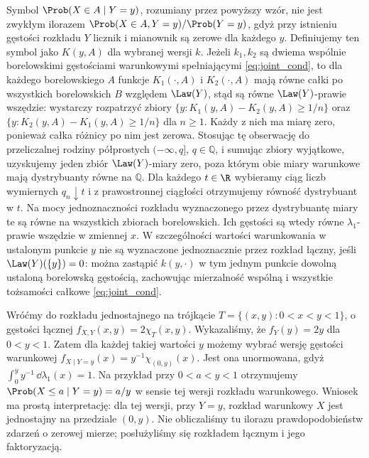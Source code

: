 \begin{uwaga}
Symbol $\Prob(X\in A\mid Y=y)$, rozumiany przez powyższy wzór,
nie jest zwykłym ilorazem $\Prob(X\in A,Y=y)/\Prob(Y=y)$,
gdyż przy istnieniu gęstości rozkładu $Y$ licznik i mianownik
są zerowe dla każdego $y$.
Definiujemy ten symbol jako $K(y,A)$ dla wybranej wersji $k$.
Jeżeli $k_1,k_2$ są dwiema wspólnie borelowskimi gęstościami
warunkowymi spełniającymi \eqref{eq:joint_cond}, to dla każdego
borelowskiego $A$ funkcje $K_1(\cdot,A)$ i $K_2(\cdot,A)$
mają równe całki po wszystkich borelowskich $B$ względem
$\Law(Y)$, stąd są równe $\Law(Y)$-prawie wszędzie:
wystarczy rozpatrzyć zbiory
$\{y:K_1(y,A)-K_2(y,A)\geq1/n\}$ oraz
$\{y:K_2(y,A)-K_1(y,A)\geq1/n\}$ dla $n\geq1$.
Każdy z nich ma miarę zero, ponieważ całka różnicy
po nim jest zerowa.
Stosując tę obserwację do przeliczalnej rodziny półprostych
$(-\infty,q]$, $q\in\mathbb Q$, i sumując zbiory wyjątkowe,
uzyskujemy jeden zbiór $\Law(Y)$-miary zero, poza którym
obie miary warunkowe mają dystrybuanty równe na $\mathbb Q$.
Dla każdego $t\in\R$ wybieramy ciąg liczb wymiernych
$q_n\downarrow t$ i z prawostronnej ciągłości otrzymujemy
równość dystrybuant w $t$. Na mocy jednoznaczności rozkładu
wyznaczonego przez dystrybuantę miary te są równe na
wszystkich zbiorach borelowskich.
Ich gęstości są wtedy równe $\lambda_1$-prawie wszędzie
w zmiennej $x$. W szczególności wartości warunkowania w
ustalonym punkcie $y$ nie są wyznaczone jednoznacznie przez
rozkład łączny, jeśli $\Law(Y)(\{y\})=0$: można zastąpić
$k(y,\cdot)$ w tym jednym punkcie dowolną ustaloną
borelowską gęstością, zachowując mierzalność wspólną
i wszystkie tożsamości całkowe \eqref{eq:joint_cond}.
\end{uwaga}

\begin{przyklad}
Wróćmy do rozkładu jednostajnego na trójkącie
$T=\{(x,y):0<x<y<1\}$, o gęstości łącznej
$f_{X,Y}(x,y)=2\chi_T(x,y)$.
Wykazaliśmy, że $f_Y(y)=2y$ dla $0<y<1$.
Zatem dla każdej takiej wartości $y$ możemy wybrać
wersję gęstości warunkowej
$f_{X\mid Y=y}(x)=y^{-1}\chi_{(0,y)}(x)$.
Jest ona unormowana, gdyż $\int_0^y y^{-1}\,\dd\lambda_1(x)=1$.
Na przykład przy $0<a<y<1$ otrzymujemy
$\Prob(X\leq a\mid Y=y)=a/y$ w sensie tej wersji
rozkładu warunkowego. Wniosek ma prostą interpretację:
dla tej wersji, przy $Y=y$, rozkład warunkowy $X$ jest
jednostajny na przedziale $(0,y)$. Nie obliczaliśmy tu ilorazu
prawdopodobieństw zdarzeń o zerowej mierze;
posłużyliśmy się rozkładem łącznym i jego faktoryzacją.
\end{przyklad}



